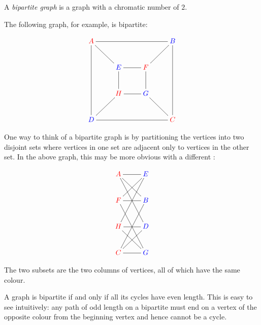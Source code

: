 \documentclass{article}
\begin{document}
A \emph{bipartite graph} is a graph with a chromatic number of $2$.

The following graph, for example, is bipartite:

$$\xymatrix{
{\color{red}A} \ar@{-}[rrr] \ar@{-}[rd] \ar@{-}[ddd] & & & {\color{blue}B} \\
& {\color{blue}E} & {\color{red}F} \ar@{-}[ur] \ar@{-}[l] \ar@{-}[d] & \\
& {\color{red}H} \ar@{-}[u] \ar@{-}[r] \ar@{-}[dl] & {\color{blue}G} & \\
{\color{blue}D} & & & {\color{red}C} \ar@{-}[uuu] \ar@{-}[lll] \ar@{-}[ul] }$$

One way to think of a bipartite graph is by partitioning the vertices into two disjoint sets where vertices in one set are adjacent only to vertices in the other set.  In the above graph, this may be more obvious with a different :

$$\xymatrix{
{\color{red}A} \ar@{-}[r] \ar@{-}[rd] \ar@{-}[rdd] & {\color{blue}E} \\
{\color{red}F} \ar@{-}[ru] \ar@{-}[r] \ar@{-}[rdd] & {\color{blue}B} \\
{\color{red}H} \ar@{-}[ruu] \ar@{-}[r] \ar@{-}[rd] & {\color{blue}D} \\
{\color{red}C} \ar@{-}[ruu] \ar@{-}[ru] \ar@{-}[r] & {\color{blue}G}}$$

The two subsets are the two columns of vertices, all of which have the same colour.

A graph is bipartite if and only if all its cycles have even length.  This is easy to see intuitively: any path of odd length on a bipartite must end on a vertex of the opposite colour from the beginning vertex and hence cannot be a cycle.
\end{document}
